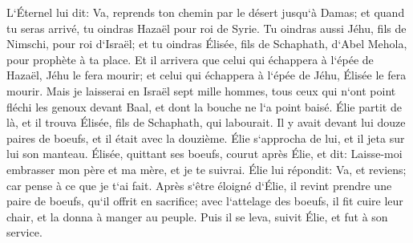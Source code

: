 \verse L`Éternel lui dit: Va, reprends ton chemin par le désert jusqu`à Damas; et quand tu seras arrivé, tu oindras Hazaël pour roi de Syrie. 
\verse Tu oindras aussi Jéhu, fils de Nimschi, pour roi d`Israël; et tu oindras Élisée, fils de Schaphath, d`Abel Mehola, pour prophète à ta place. 
\verse Et il arrivera que celui qui échappera à l`épée de Hazaël, Jéhu le fera mourir; et celui qui échappera à l`épée de Jéhu, Élisée le fera mourir. 
\verse Mais je laisserai en Israël sept mille hommes, tous ceux qui n`ont point fléchi les genoux devant Baal, et dont la bouche ne l`a point baisé. 
\verse Élie partit de là, et il trouva Élisée, fils de Schaphath, qui labourait. Il y avait devant lui douze paires de boeufs, et il était avec la douzième. Élie s`approcha de lui, et il jeta sur lui son manteau. 
\verse Élisée, quittant ses boeufs, courut après Élie, et dit: Laisse-moi embrasser mon père et ma mère, et je te suivrai. Élie lui répondit: Va, et reviens; car pense à ce que je t`ai fait. 
\verse Après s`être éloigné d`Élie, il revint prendre une paire de boeufs, qu`il offrit en sacrifice; avec l`attelage des boeufs, il fit cuire leur chair, et la donna à manger au peuple. Puis il se leva, suivit Élie, et fut à son service. 

